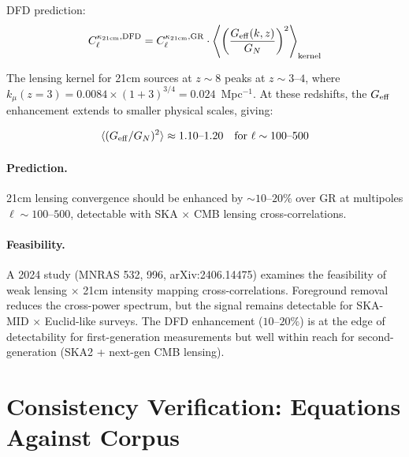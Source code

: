 \documentclass[11pt,a4paper]{article}
\newcommand{\Geff}{G_{\rm eff}}
\newcommand{\kmu}{k_\mu}
\begin{document}
DFD prediction:
\begin{equation}
C_\ell^{\kappa_{21\rm cm}, \rm DFD}
= C_\ell^{\kappa_{21\rm cm}, \rm GR} \cdot
\left\langle \left(\frac{\Geff(k,z)}{G_N}\right)^2 \right\rangle_{\rm kernel}
\end{equation}

The lensing kernel for 21cm sources at $z \sim 8$ peaks at $z \sim 3$--$4$,
where $\kmu(z=3) = 0.0084 \times (1+3)^{3/4} = 0.024$~Mpc$^{-1}$.
At these redshifts, the $\Geff$ enhancement extends to smaller physical
scales, giving:

\begin{equation}
\langle (\Geff/G_N)^2 \rangle \approx 1.10\text{--}1.20
\quad \text{for } \ell \sim 100\text{--}500
\end{equation}

\paragraph{Prediction.}
21cm lensing convergence should be enhanced by $\sim 10$--$20\%$ over
GR at multipoles $\ell \sim 100$--$500$, detectable with SKA $\times$
CMB lensing cross-correlations.

\paragraph{Feasibility.}
A 2024 study (MNRAS 532, 996, arXiv:2406.14475) examines the feasibility
of weak lensing $\times$ 21cm intensity mapping cross-correlations.
Foreground removal reduces the cross-power spectrum, but the signal
remains detectable for SKA-MID $\times$ Euclid-like surveys.  The
DFD enhancement ($10$--$20\%$) is at the edge of detectability for
first-generation measurements but well within reach for second-generation
(SKA2 + next-gen CMB lensing).


\section{Consistency Verification: Equations Against Corpus}
\end{document}
